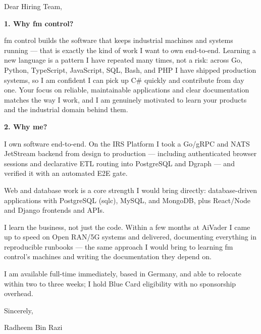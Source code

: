 \documentclass[11pt,a4paper]{coverletter}
\begin{document}

\opening{Dear Hiring Team,}

\vspace{8pt}\noindent\textbf{1. Why fm control?}\par\vspace{3pt}

fm control builds the software that keeps industrial machines and systems running — that is exactly the kind of work I want to own end-to-end. Learning a new language is a pattern I have repeated many times, not a risk: across Go, Python, TypeScript, JavaScript, SQL, Bash, and PHP I have shipped production systems, so I am confident I can pick up C\# quickly and contribute from day one. Your focus on reliable, maintainable applications and clear documentation matches the way I work, and I am genuinely motivated to learn your products and the industrial domain behind them.

\vspace{8pt}\noindent\textbf{2. Why me?}\par\vspace{3pt}

\bullets

  \item I own software end-to-end. On the IRS Platform I took a Go/gRPC and NATS JetStream backend from design to production — including authenticated browser sessions and declarative ETL routing into PostgreSQL and Dgraph — and verified it with an automated E2E gate.

  \item Web and database work is a core strength I would bring directly: database-driven applications with PostgreSQL (sqlc), MySQL, and MongoDB, plus React/Node and Django frontends and APIs.

  \item I learn the business, not just the code. Within a few months at AiVader I came up to speed on Open RAN/5G systems and delivered, documenting everything in reproducible runbooks — the same approach I would bring to learning fm control's machines and writing the documentation they depend on.

\bulletsend

I am available full-time immediately, based in Germany, and able to relocate within two to three weeks; I hold Blue Card eligibility with no sponsorship overhead.

\closing{Sincerely,}{Radheem Bin Razi}
\end{document}
